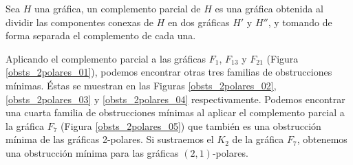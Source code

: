 \begin{definition}
\label{def_complemento_parcial}
Sea $H$ una gráfica, un complemento parcial de $H$ es una gráfica obtenida al dividir las componentes conexas de $H$ en dos gráficas $H'$ y $H''$, y tomando de forma separada el complemento de cada una.
\end{definition}

Aplicando el complemento parcial a las gráficas $F_1$, $F_{13}$ y $F_{21}$ (Figura \ref{obsts_2polares_01}), podemos encontrar otras tres familias de obstrucciones mínimas. Éstas se muestran en las Figuras \ref{obsts_2polares_02}, \ref{obsts_2polares_03} y \ref{obsts_2polares_04} respectivamente. Podemos encontrar una cuarta familia de obstrucciones mínimas al aplicar el complemento parcial a la gráfica $F_7$ (Figura \ref{obsts_2polares_05}) que también es una obstrucción mínima de las gráficas 2-polares. Si sustraemos el $K_2$ de la gráfica $F_7$, obtenemos una obstrucción mínima para las gráficas $(2,1)$-polares.

